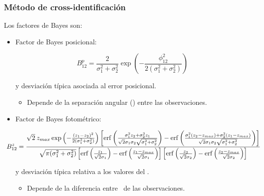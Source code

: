 \documentclass[8pt]{beamer}
\begin{document}
\begin{frame}

\frametitle{Método de cross-identificación}

Los factores de Bayes son:

\begin{itemize}

\item Factor de Bayes posicional:

\begin{equation*}
    B_{12}^{p}= \frac{2}{{\sigma}^2_1+{\sigma}^2_2}\exp{\left(- \frac{{\phi}^{2}_{12}}{2({\sigma}^2_1+{\sigma}^2_2)} \right)}
\end{equation*}

\hspace{2mm}

 y  desviación típica asociada al error posicional.

    \begin{itemize}
         \item Depende de la separación angular () entre las observaciones.
    \end{itemize}    

\hspace{2mm}

\item Factor de Bayes fotométrico:

\small{

\begin{equation*}
    \hspace{-5mm} B_{12}^{z}=\frac{\sqrt{2}\:z_{max}\exp{\left(-\frac{{(z_1-z_2)}^{2}}{2({\sigma}_{1}^{2}+{\sigma}_{2}^{2})}\right)}\left[ \erf{\left( \frac{{\sigma}_{1}^{2}z_2+{\sigma}_{2}^{2}z_1}{\sqrt{2}\sigma_1\sigma_2\sqrt{\sigma_1^2+\sigma_2^2}}  \right)}- \erf{\left( \frac{{\sigma}_{1}^{2}(z_2-z_{max})+\sigma_2^2(z_1-z_{max})}{\sqrt{2}\sigma_1\sigma_2\sqrt{\sigma_1^2+\sigma_2^2}}  \right)} \right]}{\sqrt{\pi(\sigma_1^2+\sigma_2^2)}\left[\erf{\left(\frac{z_1}{\sqrt{2}\sigma_1}\right)}-\erf{\left(\frac{z_1-z_{max}}{\sqrt{2}\sigma_1}\right)}\right]\left[\erf{\left(\frac{z_2}{\sqrt{2}\sigma_2} \right)}-\erf{\left(\frac{z_2-z_{max}}{\sqrt{2}\sigma_2} \right)}\right]}
\end{equation*}

}

\normalsize

\hspace{2mm}

 y  desviación típica relativa a los valores del \rt.

\begin{itemize}
    \item Depende de la diferencia entre \rts\ de las observaciones. 
\end{itemize} 

\end{itemize} 

\end{frame}
\end{document}
